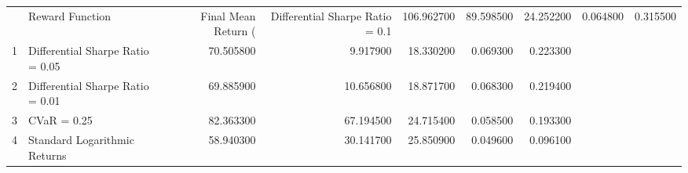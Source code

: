 \begin{tabular}{llrrrrr}
\toprule
 & Reward Function & Final Mean Return (%
 & Differential Sharpe Ratio = 0.1 & 106.962700 & 89.598500 & 24.252200 & 0.064800 & 0.315500 \\
1 & Differential Sharpe Ratio = 0.05 & 70.505800 & 9.917900 & 18.330200 & 0.069300 & 0.223300 \\
2 & Differential Sharpe Ratio = 0.01 & 69.885900 & 10.656800 & 18.871700 & 0.068300 & 0.219400 \\
3 & CVaR = 0.25 & 82.363300 & 67.194500 & 24.715400 & 0.058500 & 0.193300 \\
4 & Standard Logarithmic Returns & 58.940300 & 30.141700 & 25.850900 & 0.049600 & 0.096100 \\
\bottomrule
\end{tabular}
